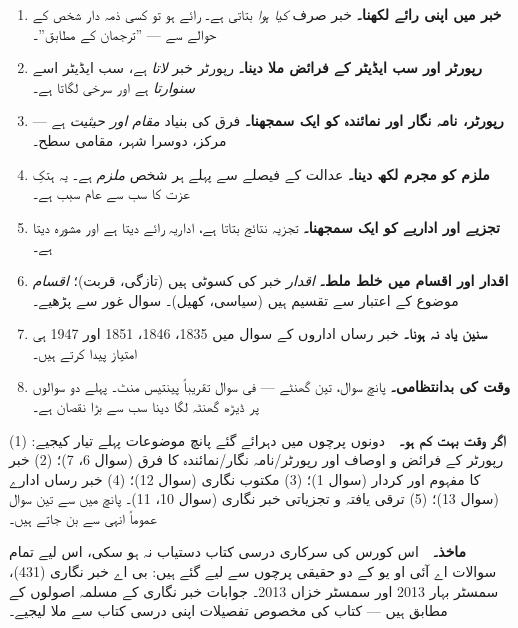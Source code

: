 \begin{enumerate}\setlength{\itemsep}{5pt}
  \item \textbf{خبر میں اپنی رائے لکھنا۔} خبر صرف \emph{کیا ہوا} بتاتی ہے۔
        رائے ہو تو کسی ذمہ دار شخص کے حوالے سے --- ''ترجمان کے مطابق''۔
  \item \textbf{رپورٹر اور سب ایڈیٹر کے فرائض ملا دینا۔} رپورٹر خبر
        \emph{لاتا} ہے، سب ایڈیٹر اسے \emph{سنوارتا} ہے اور سرخی لگاتا ہے۔
  \item \textbf{رپورٹر، نامہ نگار اور نمائندہ کو ایک سمجھنا۔} فرق کی بنیاد
        \emph{مقام اور حیثیت} ہے --- مرکز، دوسرا شہر، مقامی سطح۔
  \item \textbf{ملزم کو مجرم لکھ دینا۔} عدالت کے فیصلے سے پہلے ہر شخص
        \emph{ملزم} ہے۔ یہ ہتکِ عزت کا سب سے عام سبب ہے۔
  \item \textbf{تجزیے اور اداریے کو ایک سمجھنا۔} تجزیہ نتائج بتاتا ہے، اداریہ
        رائے دیتا ہے اور مشورہ دیتا ہے۔
  \item \textbf{اقدار اور اقسام میں خلط ملط۔} \emph{اقدار} خبر کی کسوٹی ہیں
        (تازگی، قربت)؛ \emph{اقسام} موضوع کے اعتبار سے تقسیم ہیں (سیاسی،
        کھیل)۔ سوال غور سے پڑھیے۔
  \item \textbf{سنین یاد نہ ہونا۔} خبر رساں اداروں کے سوال میں
        \textenglish{1835}، \textenglish{1846}، \textenglish{1851} اور
        \textenglish{1947} ہی امتیاز پیدا کرتے ہیں۔
  \item \textbf{وقت کی بدانتظامی۔} پانچ سوال، تین گھنٹے --- فی سوال تقریباً
        پینتیس منٹ۔ پہلے دو سوالوں پر ڈیڑھ گھنٹہ لگا دینا سب سے بڑا نقصان ہے۔
\end{enumerate}

\vfill
\begin{center}
\begin{tcolorbox}[enhanced, colback=white, colframe=bmblue, boxrule=0.5pt,
                  arc=3pt, width=0.94\linewidth,
                  left=11pt, right=11pt, top=9pt, bottom=9pt]
\small
\textbf{\color{bmblue}اگر وقت بہت کم ہو۔}\ \
دونوں پرچوں میں دہرائے گئے پانچ موضوعات پہلے تیار کیجیے:
\textenglish{(1)} رپورٹر کے فرائض و اوصاف اور رپورٹر/نامہ نگار/نمائندہ کا فرق
(سوال \textenglish{6}، \textenglish{7})؛
\textenglish{(2)} خبر کا مفہوم اور کردار (سوال \textenglish{1})؛
\textenglish{(3)} مکتوب نگاری (سوال \textenglish{12})؛
\textenglish{(4)} خبر رساں ادارے (سوال \textenglish{13})؛
\textenglish{(5)} ترقی یافتہ و تجزیاتی خبر نگاری (سوال \textenglish{10}،
\textenglish{11})۔
پانچ میں سے تین سوال عموماً انہی سے بن جاتے ہیں۔

\medskip
\textbf{\color{bmblue}ماخذ۔}\ \
اس کورس کی سرکاری درسی کتاب دستیاب نہ ہو سکی، اس لیے تمام سوالات اے آئی او یو
کے دو حقیقی پرچوں سے لیے گئے ہیں: بی اے خبر نگاری (\textenglish{431})، سمسٹر
بہار \textenglish{2013} اور سمسٹر خزاں \textenglish{2013}۔ جوابات خبر نگاری کے
مسلمہ اصولوں کے مطابق ہیں --- کتاب کی مخصوص تفصیلات اپنی درسی کتاب سے ملا
لیجیے۔
\end{tcolorbox}
\end{center}
